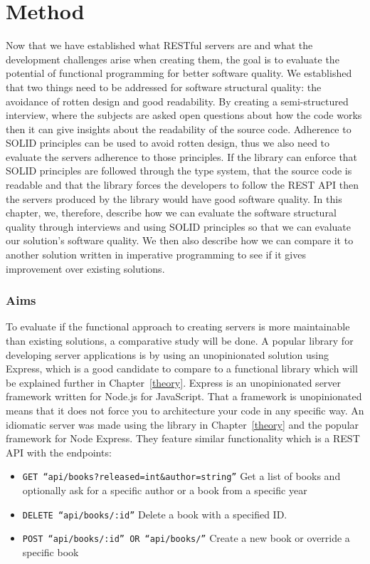 \chapter{Method}\label{method}

Now that we have established what RESTful servers are and what the development
challenges arise when creating them, the goal is to evaluate the potential of
functional programming for better software quality. We established that two
things need to be addressed for software structural quality: the avoidance of
rotten design and good readability. By creating a semi-structured interview,
where the subjects are asked open questions about how the code works then it can
give insights about the readability of the source code. Adherence to SOLID
principles can be used to avoid rotten design, thus we also need to evaluate the
servers adherence to those principles. If the library can enforce that SOLID
principles are followed through the type system, that the source code is
readable and that the library forces the developers to follow the REST API then
the servers produced by the library would have good software quality. In this
chapter, we, therefore, describe how we can evaluate the software structural
quality through interviews and using SOLID principles so that we can evaluate
our solution's software quality. We then also describe how we can compare it to
another solution written in imperative programming to see if it gives
improvement over existing solutions.

\subsection{Aims}

To evaluate if the functional approach to creating servers is more maintainable
than existing solutions, a comparative study will be done.  A popular library
for developing server applications is by using an unopinionated solution using
Express, which is a good candidate to compare to a functional library which will
be explained further in Chapter~\ref{theory}.  Express is an unopinionated
server framework written for Node.js for JavaScript.  That a framework is
unopinionated means that it does not force you to architecture your code in any
specific way. An idiomatic server was made using the library in
Chapter~\ref{theory} and the popular framework for Node Express. They feature
similar functionality which is a REST API with the endpoints:

\begin{itemize}
    \item \texttt{GET ``api/books?released=int\&author=string''} Get a list of
    books and optionally ask for a specific author or a book from a specific
    year
    \item \texttt{DELETE ``api/books/:id''} Delete a book with a specified ID.
    \item \texttt{POST ``api/books/:id'' OR ``api/books/''} Create a new book or
    override a specific book
\end{itemize}

